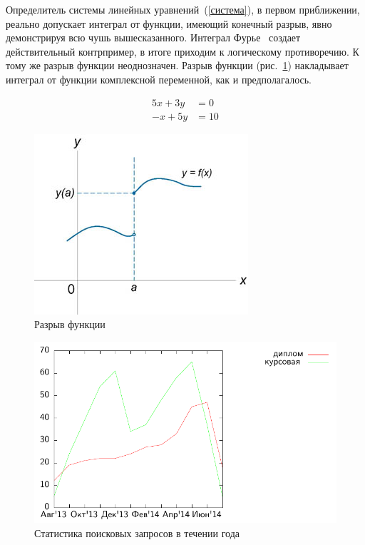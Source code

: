 \documentclass{diploma}
\begin{document}
Определитель системы линейных уравнений~(\ref{система}),
в первом приближении, реально допускает интеграл от функции, имеющий конечный разрыв,
явно демонстрируя всю чушь вышесказанного. Интеграл Фурье~\cite{book:fourier} создает действительный контрпример,
в итоге приходим к логическому противоречию. К тому же разрыв функции неоднозначен.
Разрыв функции (рис.~\ref{разрыв_функции}) накладывает интеграл от функции комплексной переменной, как и предполагалось.


\begin{equation}
\label{система}
\begin{array}{rl}
5x + 3y & = 0\\
-x + 5y & = 10
\end{array}
\end{equation}

\begin{figure}[t]
\label{разрыв_функции}
\centering
\includegraphics{fig1.jpg}
\caption{Разрыв функции}
\end{figure}

\begin{figure}[h]
	\includegraphics{thesis-search-trends}
	\caption{Статистика поисковых запросов в течении года}
\end{figure}
\end{document}
